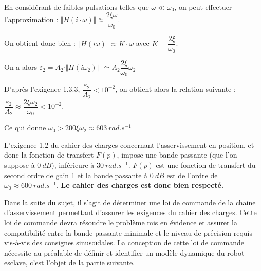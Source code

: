 \ifprof
\begin{corrige}
En considérant de faibles pulsations telles que $\omega\ll \omega_0$, on peut effectuer l'approximation : 
$\Vert H(i\cdot \omega)\Vert\approx\dfrac{2\xi\omega}{\omega_0}$.

On obtient donc bien : $\Vert H(i\omega)\Vert\approx K\cdot \omega $  avec $K=\dfrac{2\xi}{\omega_0}$.

On a alors $\varepsilon_2=A_2\cdot \Vert H(i\omega_2)\Vert $ $\simeq A_2 \dfrac{2\xi}{\omega_0}\omega_2$
\end{corrige}
\else
\fi


\ifprof
\begin{corrige}
D'après l'exigence 1.3.3, $\dfrac{\varepsilon_2}{A_2}<10^{-2}$, on obtient alors la relation suivante : $
\dfrac{\varepsilon_2}{A_2}\approx \dfrac{2\xi\omega_2}{\omega_0}<10^{-2}$.  

Ce qui donne $\omega_0>200\xi\omega_2\approx \SI{603}{rad.s^{-1}}$

L'exigence 1.2 du cahier des charges concernant l'asservissement en position, et donc la fonction de transfert $F(p)$, impose une bande passante (que l'on suppose à $\SI{0}{dB}$), inférieure à $\SI{30}{rad.s^{-1}}$. $F(p)$ est une fonction de transfert du second ordre de gain 1 et la bande passante à $\SI{0}{dB}$ est de l'ordre de $\omega_0\approx \SI{600}{rad.s^{-1}}$. \textbf{Le cahier des charges est donc bien respecté.}
\end{corrige}
\else
\fi


Dans la suite du sujet, il s'agit de déterminer une loi de commande de la chaine d'asservissement permettant d'assurer les exigences du cahier des charges. Cette loi de commande devra résoudre le problème mis en évidence et assurer la compatibilité entre la bande passante minimale et le niveau de précision requis vis-à-vis des consignes sinusoïdales. La conception de cette loi de commande nécessite au préalable de définir et identifier un modèle dynamique du robot esclave, c'est l'objet de la partie suivante.

